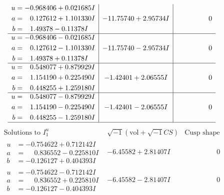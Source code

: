 \documentclass[1p]{elsarticle_modified}
\theoremstyle{definition}
\newcommand{\I}{\sqrt{-1}}
\begin{document}
$$\begin{array}{c|c|c}
\begin{aligned}
u &= -0.968406 + 0.021685 I \\
a &= \phantom{-}0.127612 + 1.101330 I \\
b &= \phantom{-}1.49378 - 0.11378 I\end{aligned}
 & -11.75740 + 2.95734 I & \phantom{-0.000000 } 0 \\ \hline\begin{aligned}
u &= -0.968406 - 0.021685 I \\
a &= \phantom{-}0.127612 - 1.101330 I \\
b &= \phantom{-}1.49378 + 0.11378 I\end{aligned}
 & -11.75740 - 2.95734 I & \phantom{-0.000000 } 0 \\ \hline\begin{aligned}
u &= \phantom{-}0.548077 + 0.879929 I \\
a &= \phantom{-}1.154190 + 0.225490 I \\
b &= \phantom{-}0.448255 + 1.259180 I\end{aligned}
 & -1.42401 + 2.06555 I & \phantom{-0.000000 } 0 \\ \hline\begin{aligned}
u &= \phantom{-}0.548077 - 0.879929 I \\
a &= \phantom{-}1.154190 - 0.225490 I \\
b &= \phantom{-}0.448255 - 1.259180 I\end{aligned}
 & -1.42401 - 2.06555 I & \phantom{-0.000000 } 0\\
 \hline 
 \end{array}$$\newpage$$\begin{array}{c|c|c}  
\text{Solutions to }I^u_{1}& \I (\text{vol} + \sqrt{-1}CS) & \text{Cusp shape}\\
 \hline 
\begin{aligned}
u &= -0.754622 + 0.712142 I \\
a &= \phantom{-}0.836552 - 0.225810 I \\
b &= -0.126127 + 0.404393 I\end{aligned}
 & -6.45582 + 2.81407 I & \phantom{-0.000000 } 0 \\ \hline\begin{aligned}
u &= -0.754622 - 0.712142 I \\
a &= \phantom{-}0.836552 + 0.225810 I \\
b &= -0.126127 - 0.404393 I\end{aligned}
 & -6.45582 - 2.81407 I & \phantom{-0.000000 } 0 \\ \hline\begin{aligned}

\end{aligned}
\end{array}$$
\end{document}
